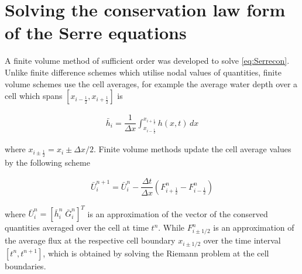 \documentclass[SingleSpace,12pt]{Serre_ASCE}
\begin{document}
\section{Solving the conservation law form of the Serre equations}
A finite volume method of sufficient order was developed to solve \eqref{eq:Serrecon}. Unlike finite difference schemes which utilise nodal values of quantities, finite volume schemes use the cell averages, for example the average water depth over a cell which spans $\left[x_{i - \frac{1}{2}} , x_{i + \frac{1}{2}}\right]$ is 
\begin{linenomath*}
\begin{gather*}
\bar{h}_i = \dfrac{1}{\Delta x} \int_{x_{i-\frac{1}{2}}}^{x_{i+\frac{1}{2}}} h(x,t) \, dx 
\end{gather*}
\end{linenomath*}
where $x_{i \pm \frac{1}{2}} = x_i \pm \Delta x/2$. Finite volume methods update the cell average values by the following scheme
\begin{linenomath*}
\begin{gather}\label{eq:FVMupdate}
\bar{U}^{n+1}_i = \bar{U}^{n}_i - \dfrac{\Delta t}{\Delta x} \left(F^n_{i+ \frac{1}{2}} - F^n_{i - \frac{1}{2}} \right)
\end{gather}
\end{linenomath*}
where $\bar{U}^{n}_i = \left[ \bar{h}^{n}_i \; \bar{G}^{n}_i \right] ^T$ is an approximation of the vector of the conserved quantities averaged over the cell at time $t^n$. While $F^n_{i\pm 1/2}$ is an approximation of the average flux at the respective cell boundary $x_{i \pm 1/2 }$ over the time interval $[t^n, t^{n+1}]$, which is obtained by solving the Riemann problem at the cell boundaries.
\end{document}

